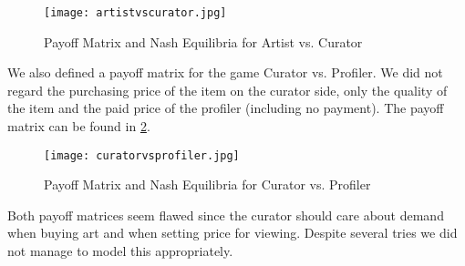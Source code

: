 \documentclass[a4paper, 11pt]{article}
\begin{document}
\begin{figure}
	\begin{center}
		\texttt{[image: artistvscurator.jpg]}
		\caption{Payoff Matrix and Nash Equilibria for Artist vs. Curator}
		\label{fig:results1}
	\end{center}
\end{figure}

We also defined a payoff matrix for the game Curator vs. Profiler. We did not regard the purchasing price of the item on the curator side, only the quality of the item and the paid price of the profiler (including no payment). The payoff matrix can be found in \ref{fig:results2}.

\begin{figure}
	\begin{center}
		\texttt{[image: curatorvsprofiler.jpg]}
		\caption{Payoff Matrix and Nash Equilibria for Curator vs. Profiler}
		\label{fig:results2}
	\end{center}
\end{figure}

Both payoff matrices seem flawed since the curator should care about demand when buying art and when setting price for viewing. Despite several tries we did not manage to model this appropriately.
\end{document}
